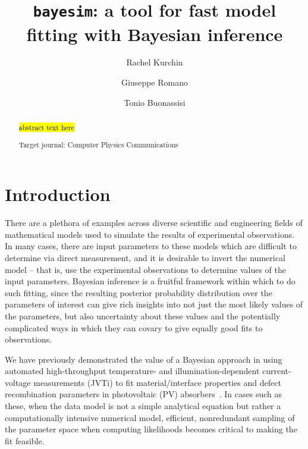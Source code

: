 \documentclass[aps,prl,amsmath,amssymb,superscriptaddress,notitlepage,groupedaddress]{revtex4-1}
\begin{document}
\title{\texttt{bayesim}: a tool for fast model fitting with Bayesian inference}
\author{Rachel Kurchin}
\author{Giuseppe Romano}
\author{Tonio Buonassisi}

\begin{abstract}
  \hl{abstract text here}

  Target journal: Computer Physics Communications
\end{abstract}

\maketitle

\section*{Introduction}
  There are a plethora of examples across diverse scientific and engineering fields of mathematical models used to simulate the results of experimental observations. In many cases, there are input parameters to these models which are difficult to determine via direct measurement, and it is desirable to invert the numerical model -- that is, use the experimental observations to determine values of the input parameters. Bayesian inference is a fruitful framework within which to do such fitting, since the resulting posterior probability distribution over the parameters of interest can give rich insights into not just the most likely values of the parameters, but also uncertainty about these values and the potentially complicated ways in which they can covary to give equally good fits to observations.

  We have previously demonstrated the value of a Bayesian approach in using automated high-throughput temperature- and illumination-dependent current-voltage measurements (JVTi) to fit material/interface properties and defect recombination parameters in photovoltaic (PV) absorbers~\cite{SnSJoule,FeBayes}. In cases such as these, when the data model is not a simple analytical equation but rather a computationally intensive numerical model, efficient, nonredundant sampling of the parameter space when computing likelihoods becomes critical to making the fit feasible.
\end{document}
